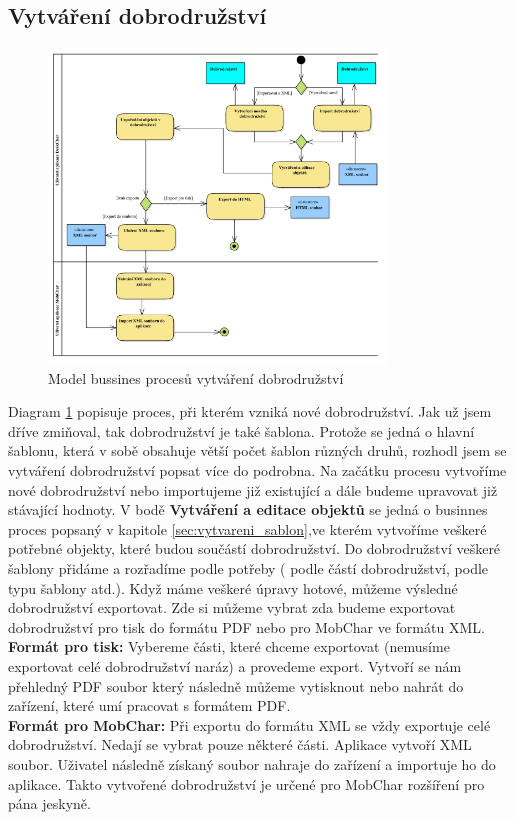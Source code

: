 \documentclass[thesis=B,czech]{resources/FITthesis}[2012/06/26]
\begin{document}
\subsection{Vytváření dobrodružství}
\begin{figure}\centering
	\includegraphics[width=0.8\textwidth]{images/business_dobrodruzstvi}
	\caption[Business proces vytváření dobrodružství]{Model bussines procesů vytváření dobrodružství}\label{fig:bp_dobrodruzsvi}
\end{figure}
Diagram \ref{fig:bp_dobrodruzsvi} popisuje proces, při kterém vzniká nové dobrodružství. Jak už jsem dříve zmiňoval, tak dobrodružství je také šablona. Protože se jedná o hlavní šablonu, která v sobě obsahuje větší počet šablon různých druhů, rozhodl jsem se vytváření dobrodružství popsat více do podrobna. Na začátku procesu vytvoříme nové dobrodružství nebo importujeme již existující a dále budeme upravovat již stávající hodnoty. V bodě \textbf{Vytváření a editace objektů} se jedná o businnes proces popsaný v kapitole \ref{sec:vytvareni_sablon},ve kterém vytvoříme veškeré potřebné objekty, které budou součástí dobrodružství. Do dobrodružství veškeré šablony přidáme a rozřadíme podle potřeby ( podle částí dobrodružství, podle typu šablony atd.). Když máme veškeré úpravy hotové, můžeme výsledné dobrodružství exportovat. Zde si můžeme vybrat zda budeme exportovat dobrodružství pro tisk do formátu PDF nebo pro MobChar ve formátu XML.\\
\textbf{Formát pro tisk:} Vybereme části, které chceme exportovat (nemusíme exportovat celé dobrodružství naráz) a provedeme export. Vytvoří se nám přehledný PDF soubor který následně můžeme vytisknout nebo nahrát do zařízení, které umí pracovat s formátem PDF.\\
\textbf{Formát pro MobChar:} Při exportu do formátu XML se vždy exportuje celé dobrodružství. Nedají se vybrat pouze některé části. Aplikace vytvoří XML soubor. Uživatel následně získaný soubor nahraje do zařízení a importuje ho do aplikace. Takto vytvořené dobrodružství je určené pro MobChar rozšíření pro pána jeskyně.
\end{document}
